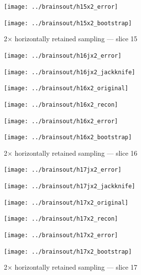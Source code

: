 \documentclass[article]{jdssv}
\begin{document}
\begin{appendix}
\begin{figure}
\begin{centering}
\parbox{\imsize}{\texttt{[image: ../brainsout/h15x2\_error]}}
\parbox{\imsize}{\texttt{[image: ../brainsout/h15x2\_bootstrap]}}

\end{centering}
\caption{2$\times$ horizontally retained sampling --- slice 15}
\end{figure}


\begin{figure}
\begin{centering}

\parbox{\imsize}{\texttt{[image: ../brainsout/h16jx2\_error]}}
\parbox{\imsize}{\texttt{[image: ../brainsout/h16jx2\_jackknife]}}

\vspace{\vertsep}

\parbox{\imsize}{\texttt{[image: ../brainsout/h16x2\_original]}}
\parbox{\imsize}{\texttt{[image: ../brainsout/h16x2\_recon]}}

\vspace{\vertsep}

\parbox{\imsize}{\texttt{[image: ../brainsout/h16x2\_error]}}
\parbox{\imsize}{\texttt{[image: ../brainsout/h16x2\_bootstrap]}}

\end{centering}
\caption{2$\times$ horizontally retained sampling --- slice 16}
\end{figure}


\begin{figure}
\begin{centering}

\parbox{\imsize}{\texttt{[image: ../brainsout/h17jx2\_error]}}
\parbox{\imsize}{\texttt{[image: ../brainsout/h17jx2\_jackknife]}}

\vspace{\vertsep}

\parbox{\imsize}{\texttt{[image: ../brainsout/h17x2\_original]}}
\parbox{\imsize}{\texttt{[image: ../brainsout/h17x2\_recon]}}

\vspace{\vertsep}

\parbox{\imsize}{\texttt{[image: ../brainsout/h17x2\_error]}}
\parbox{\imsize}{\texttt{[image: ../brainsout/h17x2\_bootstrap]}}

\end{centering}
\caption{2$\times$ horizontally retained sampling --- slice 17}
\end{figure}


\begin{figure}
\begin{centering}


\end{centering}
\end{figure}
\end{appendix}
\end{document}
